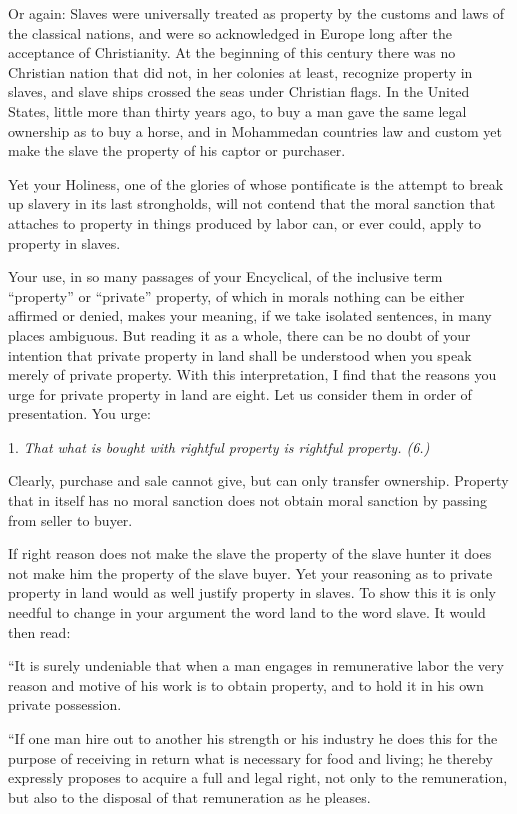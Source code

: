 \documentclass{book}
\begin{document}
Or again: Slaves were universally treated as property by the customs and laws of the classical nations, and were so acknowledged in Europe long after the acceptance of Christianity. At the beginning of this century there was no Christian nation that did not, in her colonies at least, recognize property in slaves, and slave ships crossed the seas under Christian flags. In the United States, little more than thirty years ago, to buy a man gave the same legal ownership as to buy a horse, and in Mohammedan countries law and custom yet make the slave the property of his captor or purchaser.

Yet your Holiness, one of the glories of whose pontificate is the attempt to break up slavery in its last strongholds, will not contend that the moral sanction that attaches to property in things produced by labor can, or ever could, apply to property in slaves.

Your use, in so many passages of your Encyclical, of the inclusive term “property” or “private” property, of which in morals nothing can be either affirmed or denied, makes your meaning, if we take isolated sentences, in many places ambiguous. But reading it as a whole, there can be no doubt of your intention that private property in land shall be understood when you speak merely of private property. With this interpretation, I find that the reasons you urge for private property in land are eight. Let us consider them in order of presentation. You urge:

1. \emph{That what is bought with rightful property is rightful property. (6.)}\footnotemark[1]

Clearly, purchase and sale cannot give, but can only transfer ownership. Property that in itself has no moral sanction does not obtain moral sanction by passing from seller to buyer.

If right reason does not make the slave the property of the slave hunter it does not make him the property of the slave buyer. Yet your reasoning as to private property in land would as well justify property in slaves. To show this it is only needful to change in your argument the word land to the word slave. It would then read:

“It is surely undeniable that when a man engages in remunerative labor the very reason and motive of his work is to obtain property, and to hold it in his own private possession.

“If one man hire out to another his strength or his industry he does this for the purpose of receiving in return what is necessary for food and living; he thereby expressly proposes to acquire a full and legal right, not only to the remuneration, but also to the disposal of that remuneration as he pleases.
\end{document}
